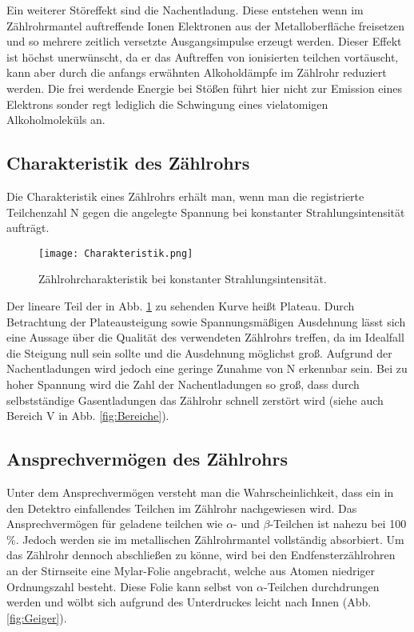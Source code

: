 Ein weiterer Störeffekt sind die Nachentladung. Diese entstehen wenn im Zählrohrmantel
auftreffende Ionen Elektronen aus der Metalloberfläche freisetzen und so mehrere
zeitlich versetzte Ausgangsimpulse erzeugt werden. Dieser Effekt ist höchst unerwünscht,
da er das Auftreffen von ionisierten teilchen vortäuscht, kann aber durch die anfangs
erwähnten Alkoholdämpfe im Zählrohr reduziert werden. Die frei werdende Energie
bei Stößen führt hier nicht zur Emission eines Elektrons sonder regt lediglich
die Schwingung eines vielatomigen Alkoholmoleküls an.

\subsection{Charakteristik des Zählrohrs}

Die Charakteristik eines Zählrohrs erhält man, wenn man die registrierte Teilchenzahl
N gegen die angelegte Spannung bei konstanter Strahlungsintensität aufträgt.

\begin{figure}
  \centering
  \texttt{[image: Charakteristik.png]}
  \caption{Zählrohrcharakteristik bei konstanter Strahlungsintensität.}
  \label{fig:Charakteristik}
\end{figure}

Der lineare Teil der in Abb. \ref{fig:Charakteristik} zu sehenden Kurve heißt
Plateau. Durch Betrachtung der Plateausteigung sowie Spannungsmäßigen Ausdehnung
lässt sich eine Aussage über die Qualität des verwendeten Zählrohrs treffen, da
im Idealfall die Steigung null sein sollte und die Ausdehnung möglichst groß.
Aufgrund der Nachentladungen wird jedoch eine geringe Zunahme von N erkennbar sein.
Bei zu hoher Spannung wird die Zahl der Nachentladungen so groß, dass durch
selbstständige Gasentladungen das Zählrohr schnell zerstört wird (siehe auch Bereich
V in Abb. \ref{fig:Bereiche}).

\subsection{Ansprechvermögen des Zählrohrs}

Unter dem Ansprechvermögen versteht man die Wahrscheinlichkeit, dass ein in den
Detektro einfallendes Teilchen im Zählrohr nachgewiesen wird. Das Ansprechvermögen
für geladene teilchen wie $\alpha$- und $\beta$-Teilchen ist nahezu bei 100 \%.
Jedoch werden sie im metallischen Zählrohrmantel vollständig absorbiert. Um das
Zählrohr dennoch abschließen zu könne, wird bei den Endfensterzählrohren an der
Stirnseite eine Mylar-Folie angebracht, welche aus Atomen niedriger Ordnungszahl
besteht. Diese Folie kann selbst von $\alpha$-Teilchen durchdrungen werden und
wölbt sich aufgrund des Unterdruckes leicht nach Innen (Abb. \ref{fig:Geiger}).

